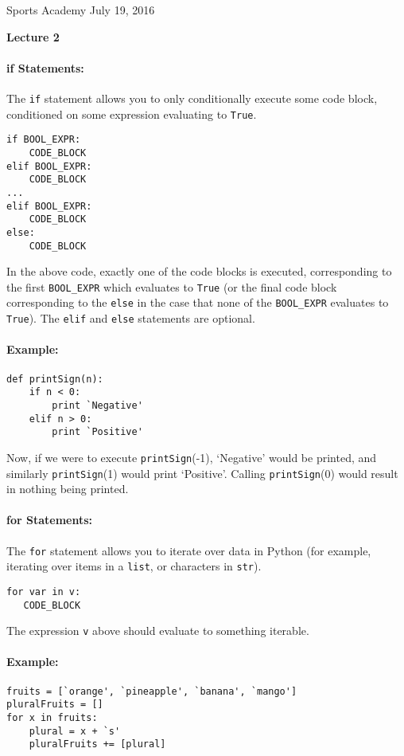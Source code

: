 \documentclass[11pt]{article}
\newlength{\toppush}
\newcommand{\htitle}[2]{\noindent\vspace*{-\toppush}\newline\parbox{6.5in}
 {\large Sports Academy \hfill #1\newline
\hspace*{\fill}{\bf Algorithms and Programming for High Schoolers} \hspace*{\fill} \newline
\mbox{}\hrulefill\mbox{}}\vspace*{1ex}\mbox{}\newline
\begin{center}{\Large\bf #2}\end{center}}
\begin{document}
\htitle{July 19, 2016}{Lecture 2}

\paragraph{\Large if Statements:}

The \texttt{if} statement allows you to only conditionally execute
some code block, conditioned on some expression evaluating to
\texttt{True}.

\begin{verbatim}
if BOOL_EXPR:
    CODE_BLOCK
elif BOOL_EXPR:
    CODE_BLOCK
...
elif BOOL_EXPR:
    CODE_BLOCK
else:
    CODE_BLOCK
\end{verbatim}


In the above code, exactly one of the code blocks is executed,
corresponding to the first \texttt{BOOL\_EXPR} which evaluates to
\texttt{True} (or the final code block corresponding to the
\texttt{else} in the case that none of the \texttt{BOOL\_EXPR}
evaluates to \texttt{True}).
The \texttt{elif} and \texttt{else} statements are optional.

\paragraph{Example:}
\begin{verbatim}
def printSign(n):
    if n < 0:
        print `Negative'
    elif n > 0:
        print `Positive'
\end{verbatim}

Now, if we were to execute \texttt{printSign}(-1), `Negative' would
be printed, and similarly \texttt{printSign}(1) would print
`Positive'.  Calling \texttt{printSign}(0) would result in nothing
being printed.

\paragraph{\Large for Statements:}
The \texttt{for} statement allows you to iterate over data in Python
(for example, iterating over items in a \texttt{list}, or characters
in \texttt{str}).

\begin{verbatim}
for var in v:
   CODE_BLOCK
\end{verbatim}

The expression \texttt{v} above should evaluate to something
iterable.

\paragraph{Example:}
\begin{verbatim}
fruits = [`orange', `pineapple', `banana', `mango']
pluralFruits = []
for x in fruits:
    plural = x + `s'
    pluralFruits += [plural]
\end{verbatim}
\end{document}
